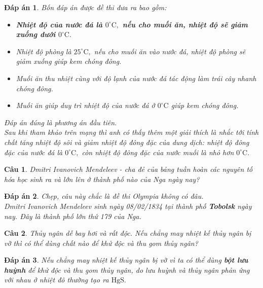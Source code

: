 \documentclass[12pt,a4paper]{article}
\newtheorem{ques}{Câu}
\theoremstyle{nonumberplain}
\newtheorem{ans}{Đáp án}
\begin{document}
\begin{mybox} \begin{ans}
Bốn đáp án được đề thi đưa ra bao gồm:
\begin{itemize}
\item \textbf{Nhiệt độ của nước đá là \(0 ^ \circ \mathrm{C},\) nếu cho muối ăn, nhiệt độ sẽ giảm xuống dưới \(0 ^ \circ \mathrm{C}.\)}
\item Nhiệt độ phòng là \(25 ^ \circ \mathrm{C},\) nếu cho muối ăn vào nước đá, nhiệt độ phòng sẽ giảm xuống giúp kem chóng đông.
\item Muối ăn thu nhiệt cùng với độ lạnh của nước đá tác động làm trái cây nhanh chóng đông.
\item Muối ăn giúp duy trì nhiệt độ của nước đá ở \(0 ^ \circ \mathrm{C}\) giúp kem chóng đông.
\end{itemize}
Đáp án đúng là phương án đầu tiên.\\
Sau khi tham khảo trên mạng thì anh có thấy thêm một giải thích là nhắc tới tính chất \textit{tăng nhiệt độ sôi và giảm nhiệt độ đông đặc} của dung dịch: nhiệt độ đông đặc của nước đá là \(0 ^ \circ \mathrm{C},\) còn nhiệt độ đông đặc của nước muối là nhỏ hơn \(0 ^ \circ \mathrm{C}.\)
\end{ans} \end{mybox}
\begin{ques}
Dmitri Ivanovich Mendeleev - cha đẻ của bảng tuần hoàn các nguyên tố hóa học sinh ra và lớn lên ở thành phố nào của Nga ngày nay?
\end{ques}
\begin{mybox} \begin{ans}
Chẹp, câu này chắc là đề thi Olympia không có đâu.\\
Dmitri Ivanovich Mendeleev sinh ngày 08/02/1834 tại thành phố \textbf{Tobolsk} ngày nay. Đây là thành phố lớn thứ 179 của Nga.
\end{ans} \end{mybox}
\begin{ques}
Thủy ngân dễ bay hơi và rất độc. Nếu chẳng may nhiệt kế thủy ngân bị vỡ thì có thể dùng chất nào để khử độc và thu gom thủy ngân?
\end{ques}
\begin{mybox} \begin{ans}
Nếu chẳng may nhiệt kế thủy ngân bị vỡ vì ta có thể dùng \textbf{bột lưu huỳnh} để khử độc và thu gom thủy ngân, do lưu huỳnh và thủy ngân phản ứng với nhau ở nhiệt đô thường tạo ra \(\mathrm{HgS}.\)
\end{ans} \end{mybox}
\end{document}
